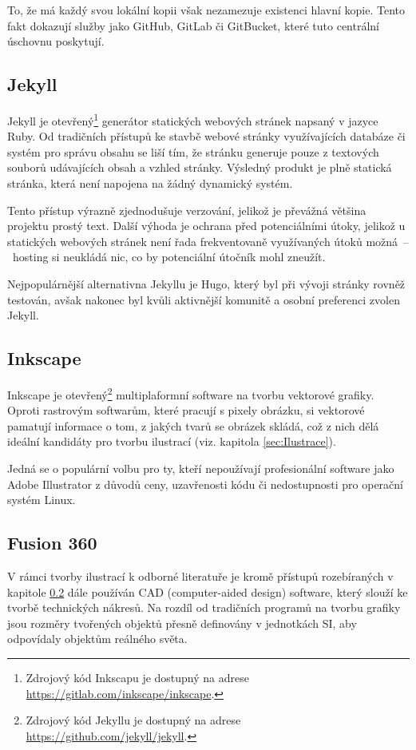 \documentclass[a4paper, 12pt]{article}
\begin{document}
  To, že má každý svou lokální kopii však nezamezuje existenci hlavní kopie. Tento fakt dokazují služby jako GitHub, GitLab či GitBucket, které tuto centrální úschovnu poskytují. %


  \subsection{Jekyll} \label{sec:Jekyll}
  Jekyll je otevřený\footnote{Zdrojový kód Inkscapu je dostupný na adrese \url{https://gitlab.com/inkscape/inkscape}.} generátor statických webových stránek napsaný v jazyce Ruby. Od tradičních přístupů ke stavbě webové stránky využívajících databáze či systém pro správu obsahu se liší tím, že stránku generuje pouze z textových souborů udávajících obsah a vzhled stránky. Výsledný produkt je plně statická stránka, která není napojena na žádný dynamický systém.

  Tento přístup výrazně zjednodušuje verzování, jelikož je převážná většina projektu prostý text. Další výhoda je ochrana před potenciálními útoky, jelikož u statických webových stránek není řada frekventovaně využívaných útoků možná~--~hosting si neukládá nic, co by potenciální útočník mohl zneužít.

  Nejpopulárnější alternativna Jekyllu je Hugo, který byl při vývoji stránky rovněž testován, avšak nakonec byl kvůli aktivnější komunitě a osobní preferenci zvolen Jekyll.


  \subsection{Inkscape} \label{sec:Inkscape}
  Inkscape je otevřený\footnote{Zdrojový kód Jekyllu je dostupný na adrese \url{https://github.com/jekyll/jekyll}.} multiplaformní software na tvorbu vektorové grafiky. Oproti rastrovým softwarům, které pracují s  pixely obrázku, si vektorové pamatují informace o tom, z jakých tvarů se obrázek skládá, což z nich dělá ideální kandidáty pro tvorbu ilustrací (viz. kapitola \ref{sec:Ilustrace}).

  Jedná se o populární volbu pro ty, kteří nepoužívají profesionální software jako Adobe Illustrator z důvodů ceny, uzavřenosti kódu či nedostupnosti pro operační systém Linux.


  \subsection{Fusion 360} \label{sec:Fusion 360}
  V rámci tvorby ilustrací k odborné literatuře je kromě přístupů rozebíraných v kapitole \ref{sec:Inkscape} dále používán CAD (computer-aided design) software, který slouží ke tvorbě technických nákresů. Na rozdíl od tradičních programů na tvorbu grafiky jsou rozměry tvořených objektů přesně definovány v jednotkách SI, aby odpovídaly objektům reálného světa.
\end{document}
